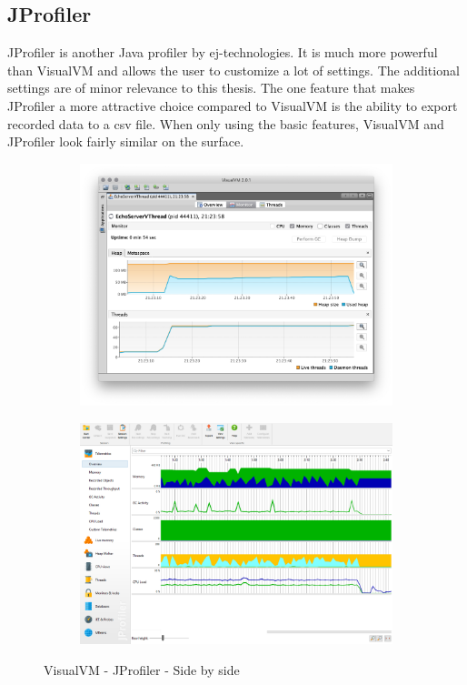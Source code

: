\subsection{JProfiler}
JProfiler is another Java profiler by ej-technologies. It is much more powerful than VisualVM and allows the user to customize a lot of settings. The additional settings are of minor relevance to this thesis. The one feature that makes JProfiler a more attractive choice compared to VisualVM is the ability to export recorded data to a csv file. When only using the basic features, VisualVM and JProfiler look fairly similar on the surface. \cite{Profiler:JProfiler}
\begin{figure}[H]
  \centering
  \begin{subfigure}[b]{0.45\textwidth}
    \includegraphics[width=1.0\linewidth]{img/visualvm-overview.png}
  \end{subfigure}
  \begin{subfigure}[b]{0.45\textwidth}
    \includegraphics[width=1.0\linewidth]{img/jprofiler-overview.png}
  \end{subfigure}
  \caption{VisualVM - JProfiler - Side by side}
\end{figure}


